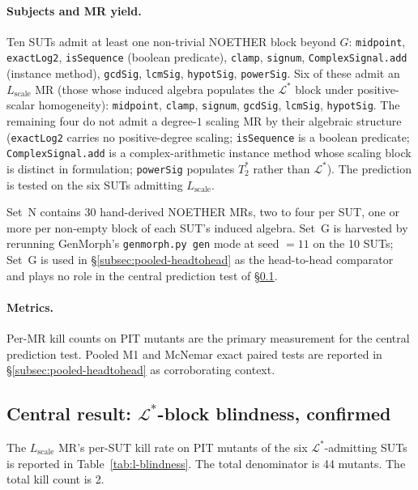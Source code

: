 \paragraph{Subjects and MR yield.}
Ten SUTs admit at least one non-trivial NOETHER block beyond $G$:
\texttt{midpoint}, \texttt{exactLog2}, \texttt{isSequence} (boolean
predicate), \texttt{clamp}, \texttt{signum},
\texttt{ComplexSignal.add} (instance method), \texttt{gcdSig},
\texttt{lcmSig}, \texttt{hypotSig}, \texttt{powerSig}. Six of these
admit an $L_{\mathrm{scale}}$ MR (those whose induced algebra
populates the $\mathcal{L}^{*}$ block under positive-scalar
homogeneity): \texttt{midpoint}, \texttt{clamp}, \texttt{signum},
\texttt{gcdSig}, \texttt{lcmSig}, \texttt{hypotSig}. The remaining
four do not admit a degree-$1$ scaling MR by their algebraic structure
(\texttt{exactLog2} carries no positive-degree scaling;
\texttt{isSequence} is a boolean predicate; \texttt{ComplexSignal.add}
is a complex-arithmetic instance method whose scaling block is
distinct in formulation; \texttt{powerSig} populates $T^{*}_{2}$
rather than $\mathcal{L}^{*}$). The prediction is tested on the six
SUTs admitting $L_{\mathrm{scale}}$.

Set~N contains 30 hand-derived NOETHER MRs, two to four per SUT, one
or more per non-empty block of each SUT's induced algebra. Set~G is
harvested by rerunning GenMorph's \texttt{genmorph.py gen} mode at
seed $=11$ on the 10 SUTs; Set~G is used in
\S\ref{subsec:pooled-headtohead} as the head-to-head comparator and
plays no role in the central prediction test of
\S\ref{subsec:l-blindness-confirmed}.

\paragraph{Metrics.}
Per-MR kill counts on PIT mutants are the primary measurement for the
central prediction test. Pooled M1 and McNemar exact paired tests are
reported in \S\ref{subsec:pooled-headtohead} as corroborating
context.

\subsection{Central result: \texorpdfstring{$\mathcal{L}^{*}$}{L*}-block blindness, confirmed}
\label{subsec:l-blindness-confirmed}

The $L_{\mathrm{scale}}$ MR's per-SUT kill rate on PIT mutants of the
six $\mathcal{L}^{*}$-admitting SUTs is reported in
Table~\ref{tab:l-blindness}. The total denominator is 44 mutants. The
total kill count is 2.

